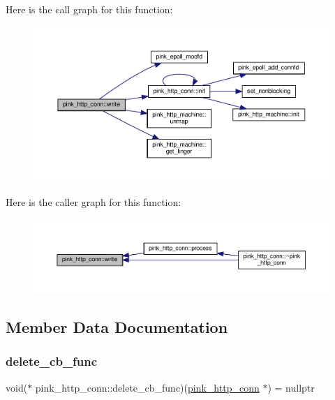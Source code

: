 Here is the call graph for this function\+:\nopagebreak
\begin{figure}[H]
\begin{center}
\leavevmode
\includegraphics[width=350pt]{classpink__http__conn_a362df085394bbf2818c8af93932c80d5_cgraph}
\end{center}
\end{figure}
Here is the caller graph for this function\+:\nopagebreak
\begin{figure}[H]
\begin{center}
\leavevmode
\includegraphics[width=350pt]{classpink__http__conn_a362df085394bbf2818c8af93932c80d5_icgraph}
\end{center}
\end{figure}


\subsection{Member Data Documentation}
\mbox{\label{classpink__http__conn_a36a48a19aa593001494eb51106628ebd}} 
\subsubsection{\texorpdfstring{delete\+\_\+cb\+\_\+func}{delete\_cb\_func}}
{\footnotesize\ttfamily void($\ast$ pink\+\_\+http\+\_\+conn\+::delete\+\_\+cb\+\_\+func)(\hyperlink{classpink__http__conn}{pink\+\_\+http\+\_\+conn} $\ast$) = nullptr\hspace{0.3cm}{\ttfamily [static]}}



